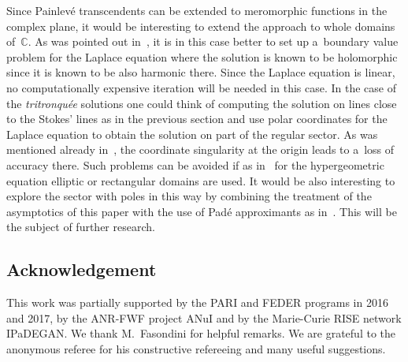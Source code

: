 \documentclass[pdftex]{sigma}
\begin{document}
Since Painlev\'e transcendents can be extended to meromorphic functions in the complex plane, it would be interesting to extend the approach to whole domains of~$\mathbb{C}$. As was pointed out in~\cite{DubrovinGravaKlein}, it is in this case better to set up a~boundary value problem for the Laplace equation where the solution is known to be holomorphic since it is known to be also harmonic there. Since the Laplace equation is linear, no computationally expensive iteration will be needed in this case. In the case of the \emph{tritronqu\'ee} solutions one could think of computing the solution on lines close to the Stokes' lines as in the previous section and use polar coordinates for the Laplace equation to obtain the solution on part of the regular sector. As was mentioned already in~\cite{DubrovinGravaKlein}, the coordinate singularity at the origin leads to a~loss of accuracy there. Such problems can be avoided if as in~\cite{CKSV} for the hypergeometric equation elliptic or rectangular domains are used. It would be also interesting to explore the sector with poles in this way by combining the treatment of the asymptotics of this paper with the use of Pad\'e approximants as in~\cite{FFW, FW}. This will be the subject of further research.

\subsection*{Acknowledgement}
This work was partially supported by the PARI and FEDER programs in 2016 and 2017, by the ANR-FWF project ANuI and by the Marie-Curie RISE network IPaDEGAN. We thank M.~Fasondini for helpful remarks. We are grateful to the anonymous referee for his constructive refereeing and many useful suggestions.
\end{document}
